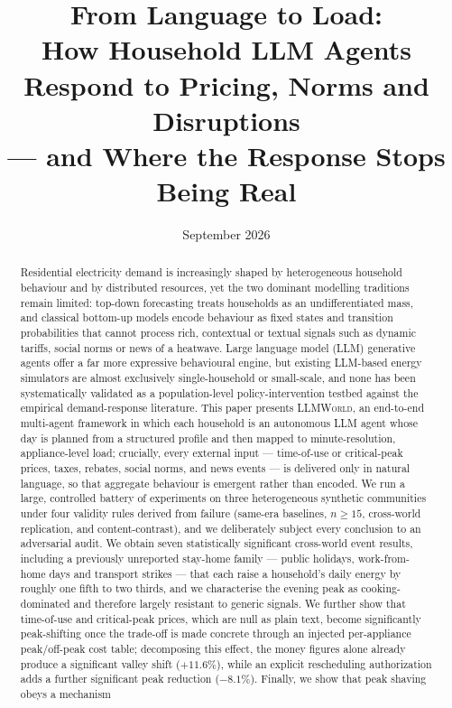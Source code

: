 \documentclass[11pt]{article}
\title{\bfseries From Language to Load:\\ How Household LLM Agents Respond to Pricing, Norms and Disruptions\\ --- and Where the Response Stops Being Real}
\author{}
\date{September 2026}
\begin{document}
\maketitle

\begin{abstract}
\noindent
Residential electricity demand is increasingly shaped by heterogeneous household behaviour and by
distributed resources, yet the two dominant modelling traditions remain limited: top-down forecasting
treats households as an undifferentiated mass, and classical bottom-up models encode behaviour as fixed
states and transition probabilities that cannot process rich, contextual or textual signals such as
dynamic tariffs, social norms or news of a heatwave. Large language model (LLM) generative agents offer a
far more expressive behavioural engine, but existing LLM-based energy simulators are almost exclusively
single-household or small-scale, and none has been systematically validated as a population-level
policy-intervention testbed against the empirical demand-response literature. This paper presents
\textsc{LLMWorld}, an end-to-end multi-agent framework in which each household is an autonomous LLM agent
whose day is planned from a structured profile and then mapped to minute-resolution, appliance-level load;
crucially, every external input --- time-of-use or critical-peak prices, taxes, rebates, social norms, and
news events --- is delivered only in natural language, so that aggregate behaviour is emergent rather than
encoded. We run a large, controlled battery of experiments on three heterogeneous synthetic communities
under four validity rules derived from failure (same-era baselines, $n\ge15$, cross-world replication, and
content-contrast), and we deliberately subject every conclusion to an adversarial audit. We obtain seven
statistically significant cross-world event results, including a previously unreported stay-home family
--- public holidays, work-from-home days and transport strikes --- that each raise a household's daily
energy by roughly one fifth to two thirds, and we characterise the evening peak as cooking-dominated and
therefore largely resistant to generic signals. We further show that time-of-use and critical-peak prices,
which are null as plain text, become significantly peak-shifting once the trade-off is made concrete
through an injected per-appliance peak/off-peak cost table; decomposing this effect, the money figures
alone already produce a significant valley shift ($+11.6\%$), while an explicit rescheduling authorization
adds a further significant peak reduction ($-8.1\%$). Finally, we show that peak shaving obeys a mechanism

\end{abstract}
\end{document}
